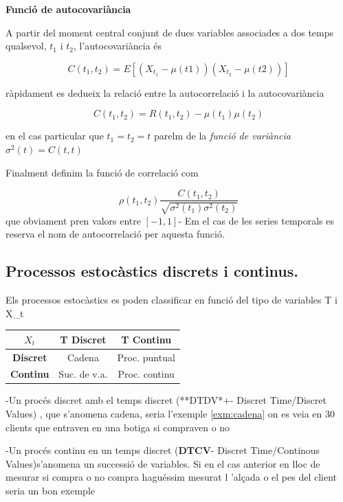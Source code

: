 \documentclass[
  catalan,
]{article}
\newcounter{none} %
\theoremstyle{definition}
\theoremstyle{definition}
\theoremstyle{definition}
\theoremstyle{definition}
\theoremstyle{remark}
\begin{document}
\textbf{Funció de autocovariància}

A partir del moment central conjunt de dues variables associades a dos temps qualsevol, \(t_1\) i \(t_2\), l'autocovariància és

\[
  C(t_1,t_2)=E[(X_{t_1}-\mu(t1))(X_{t_2}-\mu(t2))] \label{eq:aujtocovprocess}
\]

ràpidament es dedueix la relació entre la autocorrelació i la autocovariància

\[
 C(t_1,t_2)= R(t_1,t_2)-\mu(t_1)\mu(t_2)
\]

en el cas particular que \(t_1=t_2=t\) parelm de la \emph{funció de variància} \(\sigma^2(t)=C(t,t)\)

Finalment definim la funció de correlació com

\[
\rho(t_1,t_2) \dfrac {C(t_1,t_2)} {\sqrt{\sigma^2(t_1)\sigma^2(t_2)}} 
\]
que obviament pren valors entre \([-1,1]\)- Em el cas de les series temporals es reserva el nom de autocorrelació per aquesta funció.

\subsection{Processos estocàstics discrets i continus.}\label{processos-estocuxe0stics-discrets-i-continus.}

Els processos estocàstics es poden classificar en funció del tipo de variables T i X\_t

{\def\LTcaptype{none} %
\begin{longtable}[]{@{}ccc@{}}
\toprule\noalign{}
\textbf{\(X_t\) } & \textbf{T Discret} & \textbf{T Continu} \\
\midrule\noalign{}
\endhead
\bottomrule\noalign{}
\endlastfoot
\textbf{Discret} & Cadena & Proc. puntual \\
\textbf{Continu} & Suc. de v.a. & Proc. continu \\
\end{longtable}
}

-Un procés discret amb el temps discret (**DTDV*+- Discret Time/Discret Values) , que s'anomena cadena, seria l'exemple \ref{exm:cadena} on es veia en 30 clients que entraven en una botiga si compraven o no

-Un procés continu en un temps discret (\textbf{DTCV}- Discret Time/Continous Values)s'anomena un successió de variables. Si en el cas anterior en lloc de mesurar si compra o no compra haguéssim mesurat l 'alçada o el pes del client seria un bon exemple
\end{document}
